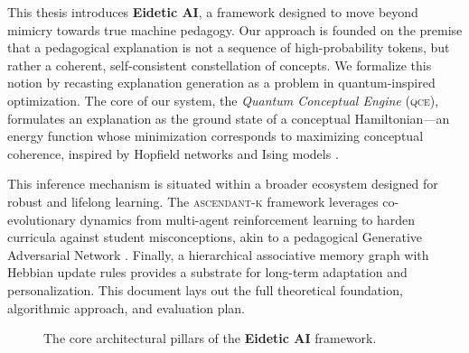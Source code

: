 \documentclass[12pt,oneside]{report}
\newcommand{\framework}[1]{\textsc{#1}}
\newcommand{\qce}{\framework{qce}}
\newcommand{\ascendantk}{\framework{ascendant-k}}
\newcommand{\eideticai}{\textbf{Eidetic AI}}
\theoremstyle{definition}
\theoremstyle{plain}
\theoremstyle{remark}
\begin{document}
This thesis introduces \eideticai{}, a framework designed to move beyond mimicry towards true machine pedagogy. Our approach is founded on the premise that a pedagogical explanation is not a sequence of high-probability tokens, but rather a coherent, self-consistent constellation of concepts. We formalize this notion by recasting explanation generation as a problem in quantum-inspired optimization. The core of our system, the \emph{Quantum Conceptual Engine} (\qce{}), formulates an explanation as the ground state of a conceptual Hamiltonian---an energy function whose minimization corresponds to maximizing conceptual coherence, inspired by Hopfield networks \cite{hopfield1982neural} and Ising models \cite{lucas2014ising}.

This inference mechanism is situated within a broader ecosystem designed for robust and lifelong learning. The \ascendantk{} framework leverages co-evolutionary dynamics from multi-agent reinforcement learning \cite{sutton2018reinforcement} to harden curricula against student misconceptions, akin to a pedagogical Generative Adversarial Network \cite{goodfellow2014generative}. Finally, a hierarchical associative memory graph with Hebbian update rules provides a substrate for long-term adaptation and personalization. This document lays out the full theoretical foundation, algorithmic approach, and evaluation plan.

\begin{figure}[H]
    \centering
    \caption{The core architectural pillars of the \eideticai{} framework.}
    \label{fig:architecture}
\end{figure}
\end{document}
